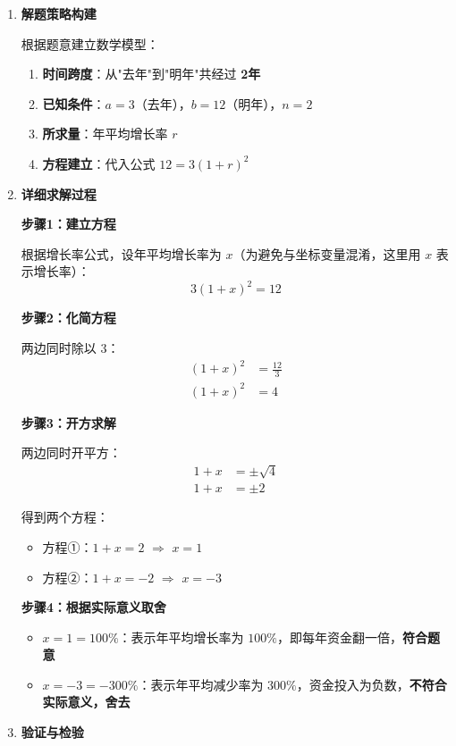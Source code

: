 \documentclass[UTF8]{ctexart}
\newenvironment{redenv}{\color{red}}{}
\newenvironment{detailedanalysis}{%
    \color{red}
    \begin{enumerate}[label=\textbf{第\arabic*步：}, leftmargin=*, align=left, itemsep=1.5ex]
}{%
    \end{enumerate}
}
\begin{document}
\begin{redenv}
\begin{detailedanalysis}
\item \textbf{解题策略构建}

根据题意建立数学模型：
\begin{enumerate}[label=(\alph*)]
    \item \textbf{时间跨度}：从"去年"到"明年"共经过 \textbf{2年}
    \item \textbf{已知条件}：$a = 3$（去年），$b = 12$（明年），$n = 2$
    \item \textbf{所求量}：年平均增长率 $r$
    \item \textbf{方程建立}：代入公式 $12 = 3(1+r)^2$
\end{enumerate}

\item \textbf{详细求解过程}

\noindent\textbf{步骤1：建立方程}

根据增长率公式，设年平均增长率为 $x$（为避免与坐标变量混淆，这里用 $x$ 表示增长率）：
\[
3(1+x)^2 = 12
\]

\noindent\textbf{步骤2：化简方程}

两边同时除以 3：
\begin{align*}
(1+x)^2 &= \frac{12}{3} \\
(1+x)^2 &= 4
\end{align*}

\noindent\textbf{步骤3：开方求解}

两边同时开平方：
\begin{align*}
1+x &= \pm\sqrt{4} \\
1+x &= \pm 2
\end{align*}

得到两个方程：
\begin{itemize}
    \item 方程①：$1+x = 2$ \quad $\Rightarrow$ \quad $x = 1$
    \item 方程②：$1+x = -2$ \quad $\Rightarrow$ \quad $x = -3$
\end{itemize}

\noindent\textbf{步骤4：根据实际意义取舍}

\begin{itemize}
    \item $x = 1 = 100\%$：表示年平均增长率为 $100\%$，即每年资金翻一倍，\textbf{符合题意}
    \item $x = -3 = -300\%$：表示年平均减少率为 $300\%$，资金投入为负数，\textbf{不符合实际意义，舍去}
\end{itemize}

\item \textbf{验证与检验}


\end{detailedanalysis}
\end{redenv}
\end{document}

